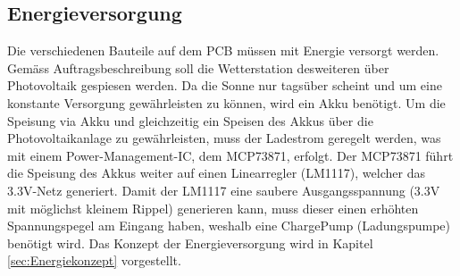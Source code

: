 \subsection{Energieversorgung}
\label{subsec:Energieversorgung}
Die verschiedenen Bauteile auf dem PCB müssen mit Energie versorgt werden. Gemäss Auftragsbeschreibung soll die Wetterstation desweiteren über Photovoltaik gespiesen werden. Da die Sonne nur tagsüber scheint und um eine konstante Versorgung gewährleisten zu können, wird ein Akku benötigt. Um die Speisung via Akku und gleichzeitig ein Speisen des Akkus über die Photovoltaikanlage zu gewährleisten, muss der Ladestrom geregelt werden, was mit einem Power-Management-IC, dem MCP73871, erfolgt. Der MCP73871 führt die Speisung des Akkus weiter auf einen Linearregler (LM1117), welcher das 3.3V-Netz generiert. Damit der LM1117 eine saubere Ausgangsspannung (3.3V mit möglichst kleinem Rippel) generieren kann, muss dieser einen erhöhten Spannungspegel am Eingang haben, weshalb eine ChargePump (Ladungspumpe) benötigt wird. Das Konzept der Energieversorgung wird in Kapitel \ref{sec:Energiekonzept} vorgestellt.
